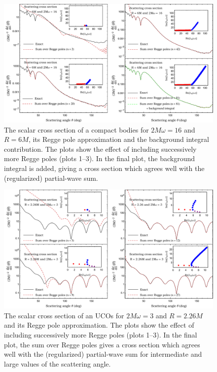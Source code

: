 \documentclass[aps,prd,longbibliography,reprint,twocolumn,amsmath,amssymb,amsfonts,showpacs,footnote,superscriptaddress]{revtex4-1}%
\begin{document}
\begin{figure}[htp!]
 \includegraphics[scale=0.50]{Scattering_Cross_Section_R_6_2Mw_16}
 \vspace*{-0.35cm}
\caption{\label{S_0_R_6_2Mw_16_Exact_vs_CAM} The scalar cross section of a compact bodies for $2M\omega=16$ and $R=6M$, its Regge pole approximation and the background integral contribution. The plots show the effect of including successively more Regge poles (plots 1--3). In the final plot, the background integral is added, giving a cross section which agrees well with the (regularized) partial-wave sum.}
\end{figure}

\begin{figure}[htp!]
\centering
 \includegraphics[scale=0.50]{Scattering_Cross_Section_R_2-dot-26_2Mw_3}
  \vspace*{-0.45cm}
\caption{\label{S_0_R_2-dot-26_2Mw_3_Exact_vs_CAM} The scalar cross section of an UCOs for $2M\omega=3$ and $R=2.26M$ and its Regge pole approximation. The plots show the effect of including successively more Regge poles (plots 1--3). In the final plot, the sum over Regge poles gives a cross section which agrees well with the (regularized) partial-wave sum for intermediate and large values of the scattering angle.}
\end{figure}
\end{document}
